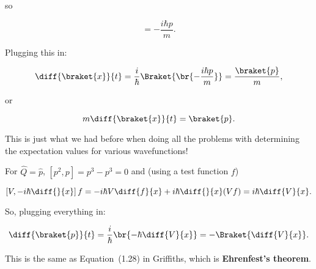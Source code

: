 \begin{parts}
so

\begin{equation}
    [\hat{H},x] = -\frac{i\hbar p}{m}.
\end{equation}

Plugging this in:

\begin{equation}
    \diff{\braket{x}}{t} = \frac{i}{\hbar}\Braket{\br{-\frac{i\hbar p}{m}}} = \frac{\braket{p}}{m},
\end{equation}

or

\begin{equation}
    m\diff{\braket{x}}{t} = \braket{p}.
\end{equation}

This is just what we had before when doing all the problems with determining the expectation values for various wavefunctions!




\item For $\hat{Q} = \hat{p}$, $[p^2,p] = p^3-p^3 = 0$ and (using a test function $f$)

\begin{equation}
    \left[ V, -i\hbar \diff{}{x} \right]f = -i\hbar V \diff{f}{x} + i\hbar\diff{}{x}(Vf) = i\hbar\diff{V}{x}.
\end{equation}

So, plugging everything in:

\begin{equation}
    \diff{\braket{p}}{t} = \frac{i}{\hbar}\br{-\hbar\diff{V}{x}} = -\Braket{\diff{V}{x}}.
\end{equation}

This is the same as Equation~(1.28) in Griffiths, which is \textbf{Ehrenfest's theorem}.





\end{parts}